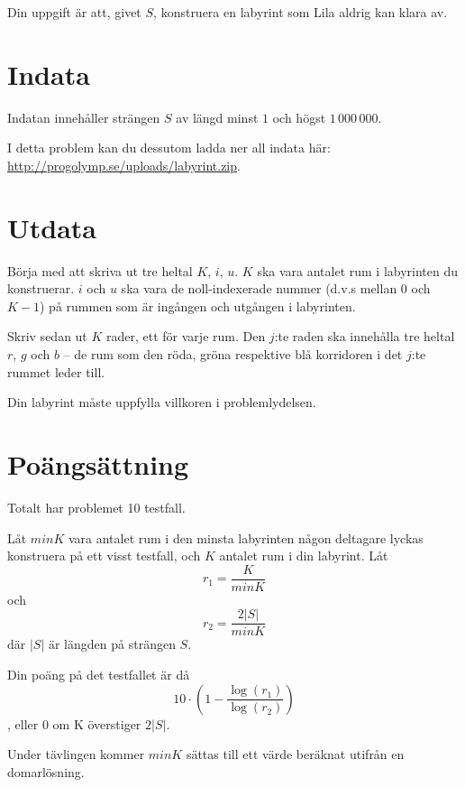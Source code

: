 Din uppgift är att, givet $S$, konstruera en labyrint som Lila aldrig kan klara av.

\section*{Indata}
Indatan innehåller strängen $S$ av längd minst $1$ och högst $1\,000\,000$.

I detta problem kan du dessutom ladda ner all indata här: \url{http://progolymp.se/uploads/labyrint.zip}.

\section*{Utdata}
Börja med att skriva ut tre heltal $K$, $i$, $u$.
$K$ ska vara antalet rum i labyrinten du konstruerar.
$i$ och $u$ ska vara de noll-indexerade nummer (d.v.s mellan $0$ och $K - 1$) på rummen som är ingången och utgången i labyrinten.

Skriv sedan ut $K$ rader, ett för varje rum.
Den $j$:te raden ska innehålla tre heltal $r$, $g$ och $b$ -- de rum som den röda, gröna respektive blå korridoren i det $j$:te rummet leder till.

Din labyrint måste uppfylla villkoren i problemlydelsen.

\section*{Poängsättning}
Totalt har problemet 10 testfall.

Låt $minK$ vara antalet rum i den minsta labyrinten någon deltagare lyckas konstruera på ett visst testfall, och $K$ antalet rum i din labyrint.
Låt
$$r_1 = \frac{K}{minK}$$
och
$$r_2 = \frac{2|S|}{minK}$$
där $|S|$ är längden på strängen $S$.

Din poäng på det testfallet är då
$$10 \cdot \left(1 - \frac{\log(r_1)}{\log(r_2)}\right)$$,
eller 0 om K överstiger $2|S|$.

Under tävlingen kommer $minK$ sättas till ett värde beräknat utifrån en domarlösning.
